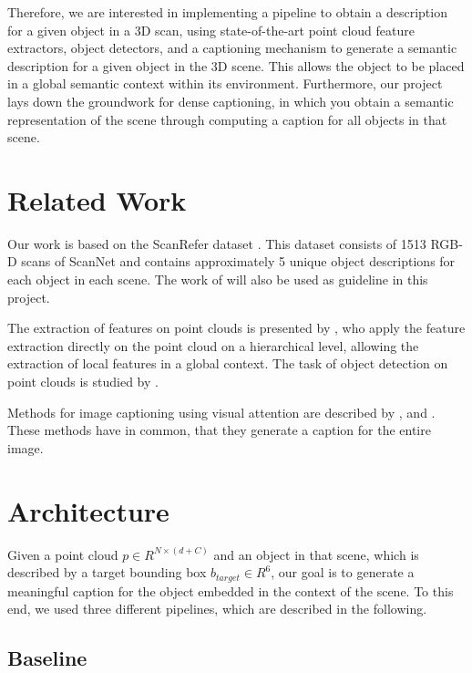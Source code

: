 \documentclass[10pt,twocolumn,letterpaper]{article}
\begin{document}
Therefore, we are interested in implementing a pipeline to obtain a description for a given object in a 3D scan, using state-of-the-art point cloud feature extractors, object detectors, and a captioning mechanism to generate a semantic description for a given object in the 3D scene. This allows the object to be placed in a global semantic context within its environment. Furthermore, our project lays down the groundwork for dense captioning, in which you obtain a semantic representation of the scene through computing a caption for all objects in that scene.
 
\section{Related Work}
Our work is based on the ScanRefer dataset \cite{chen2019scanrefer}. This dataset consists of 1513 RGB-D scans of ScanNet \cite{dai2017scannet} and contains approximately 5 unique object descriptions for each object in each scene. The work of \cite{chen2019scanrefer} will also be used as guideline in this project.

The extraction of features on point clouds is presented by \cite{qi2017pointnet++}, who apply the feature extraction directly on the point cloud on a hierarchical level, allowing the extraction of local features in a global context. 
The task of object detection on point clouds is studied by \cite{qi2019deep}. 

Methods for image captioning using visual attention are described by \cite{xu2015show}, \cite{lu2017knowing} and \cite{anderson2018bottom}.
These methods have in common, that they generate a caption for the entire image.

\section{Architecture}

Given a point cloud $\mathit{p \in R^{N\times(d+C)}}$ and an object in that scene, which is described by a target bounding box $b_{target}\in R^6$, our goal is to generate a meaningful caption for the object embedded in the context of the scene. To this end, we used three different pipelines, which are described in the following.

\subsection{Baseline}
\end{document}
